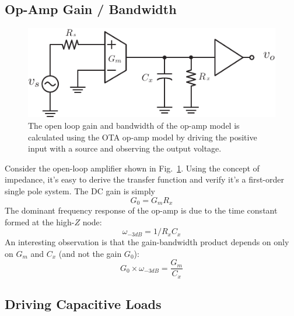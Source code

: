 \subsection{Op-Amp Gain / Bandwidth}

\begin{figure}[tb]
\begin{center}
\includegraphics[scale=1]{ota_amp_open}
\end{center}
\caption{The open loop gain and bandwidth of the op-amp model is calculated using the OTA op-amp model by driving the positive input with a source and observing the output voltage.} \label{fig:ota_amp_open}
\end{figure}

Consider the open-loop amplifier shown in Fig.~\ref{fig:ota_amp_open}.  Using the concept of impedance, it's easy to derive the transfer function and verify it's a first-order single pole system.  The DC gain is simply
%
\begin{equation}
	G_0 = {G_m}{R_x}
\end{equation}
%
The dominant frequency response of the op-amp is due to the time constant formed at the high-$Z$ node:\begin{equation}
	\omega _{ - 3dB} = 1/{R_x}{C_x}
\end{equation}
%
An interesting observation is that the gain-bandwidth product depends on only on $G_m$ and $C_x$ (and not the gain $G_0$): 
% 
\begin{equation}
	G_0 \times {\omega _{ - 3dB}} = \frac{{{G_m}}}{{{C_x}}}
\end{equation}


\subsection{Driving Capacitive Loads}

